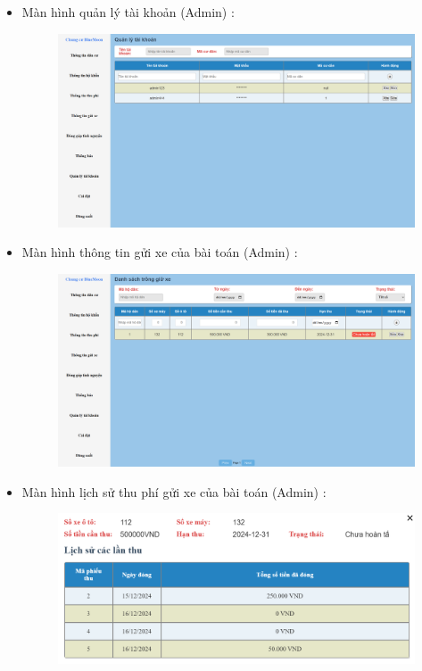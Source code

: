 \documentclass{article}
\begin{document}
\begin{itemize}
\begin{figure}[H]
    \end{figure}
    \newpage
    \item Màn hình quản lý tài khoản (Admin) :
    \begin{figure}[H]
        \centering
        \includegraphics[width=1\textwidth]{Ảnh chương 4/Quản lý tài khoản 1.png}
    \end{figure}
    \item Màn hình thông tin gửi xe của bài toán (Admin) :
    \begin{figure}[H]
        \centering
        \includegraphics[width=1\textwidth]{Ảnh chương 4/Gửi xe 1.png}
    \end{figure}
    \newpage
    \item Màn hình lịch sử thu phí gửi xe của bài toán (Admin) :
    \begin{figure}[H]
        \centering
        \includegraphics[width=1\textwidth]{Ảnh chương 4/Lịch sử gửi xe 1.png}

\end{figure}
\end{itemize}
\end{document}
